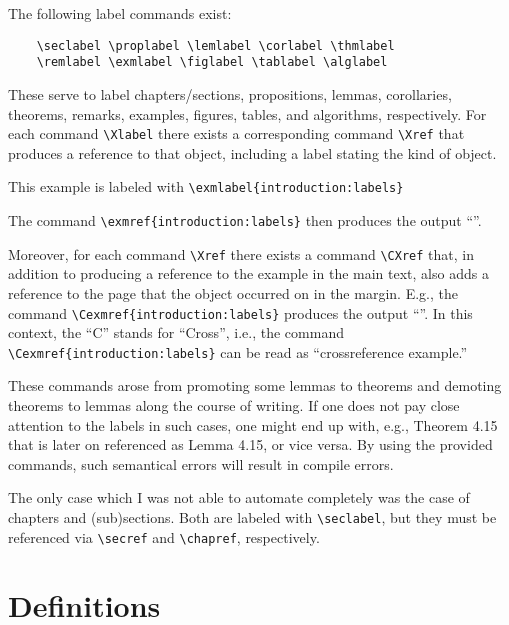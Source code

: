 The following label commands exist:
\begin{verbatim}
	\seclabel \proplabel \lemlabel \corlabel \thmlabel
	\remlabel \exmlabel \figlabel \tablabel \alglabel
\end{verbatim}

These serve to label chapters/sections, propositions, lemmas, corollaries, theorems, remarks, examples, figures, tables, and algorithms, respectively.
For each command \texttt{\textbackslash Xlabel} there exists a corresponding command \texttt{\textbackslash Xref} that produces a reference to that object, including a label stating the kind of object.

\begin{example}
This example is labeled with \texttt{\textbackslash exmlabel\{introduction:labels\}}
\end{example}

The command \texttt{\textbackslash exmref\{introduction:labels\}} then produces the output ``''.

Moreover, for each command \texttt{\textbackslash Xref} there exists a command \texttt{\textbackslash CXref} that, in addition to producing a reference to the example in the main text, also adds a reference to the page that the object occurred on in the margin.
E.g.,  the command \texttt{\textbackslash Cexmref\{introduction:labels\}} produces the output ``''.
In this context, the ``C'' stands for ``Cross'', i.e., the command \texttt{\textbackslash Cexmref\{introduction:labels\}} can be read as ``crossreference example.''

These commands arose from promoting some lemmas to theorems and demoting theorems to lemmas along the course of writing.
If one does not pay close attention to the labels in such cases, one might end up with, e.g., Theorem 4.15 that is later on referenced as Lemma 4.15, or vice versa.
By using the provided commands, such semantical errors will result in compile errors.

The only case which I was not able to automate completely was the case of chapters and (sub)sections.
Both are labeled with \texttt{\textbackslash seclabel}, but they must be referenced via \texttt{\textbackslash secref} and \texttt{\textbackslash chapref}, respectively.

\section{Definitions}

